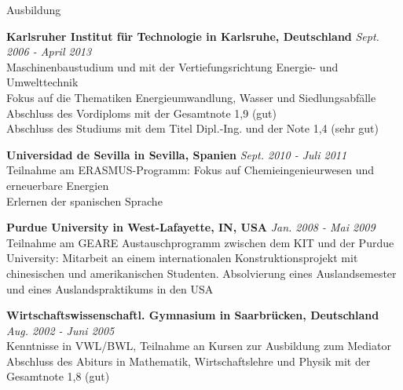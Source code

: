 \documentclass{resume}
\begin{document}
\begin{rSection}{Ausbildung}

{\bf Karlsruher Institut für Technologie in Karlsruhe, Deutschland} \hfill
{\em Sept. 2006 - April 2013}
\\
Maschinenbaustudium und  mit der Vertiefungsrichtung Energie- und Umwelttechnik 
\\
Fokus auf die Thematiken Energieumwandlung, Wasser und Siedlungsabfälle
\\
Abschluss des Vordiploms mit der Gesamtnote 1,9 (gut)
\\
Abschluss des Studiums mit dem Titel Dipl.-Ing. und der Note 1,4 (sehr gut) 


{\bf Universidad de Sevilla in Sevilla, Spanien} \hfill {\em Sept. 2010 -
Juli 2011}
\\
Teilnahme am ERASMUS-Programm: Fokus auf Chemieingenieurwesen und erneuerbare
Energien
\\
Erlernen der spanischen Sprache


{\bf Purdue University in West-Lafayette, IN, USA} \hfill {\em Jan. 2008 -
Mai 2009}
\\
Teilnahme am GEARE Austauschprogramm zwischen dem KIT und der Purdue University:
Mitarbeit an einem internationalen Konstruktionsprojekt mit chinesischen und 
amerikanischen Studenten. Absolvierung eines Auslandsemester und eines
Auslandspraktikums in den USA


{\bf Wirtschaftswissenschaftl. Gymnasium in Saarbrücken, Deutschland} \hfill
{\em Aug. 2002 - Juni 2005}
\\
Kenntnisse in VWL/BWL, Teilnahme an Kursen zur Ausbildung zum Mediator
\\
Abschluss des Abiturs in Mathematik, Wirtschaftslehre und Physik mit der
Gesamtnote 1,8 (gut)

\end{rSection}


\end{document}
